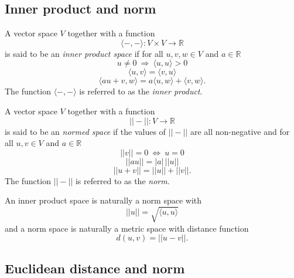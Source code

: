 \documentclass{amsart}
\begin{document}
	\subsection*{Inner product and norm} \label{inner_product_and_norm}	
	
	A vector space $V$ together with a function
	\begin{equation*}	
	\langle -, - \rangle : V \times V \to \mathbb R	
	\end{equation*}
	is said to be an \textit{inner product space} if for all $u,v,w \in V$ and $a \in \mathbb R$
	\begin{equation*}	
	u \neq 0\ \Rightarrow\ \langle u, u \rangle > 0 	
	\end{equation*}	
	\begin{equation*}	
	\langle u, v\rangle = \langle v, u\rangle	
	\end{equation*}
	\begin{equation*}
	\langle au+v, w \rangle = a\langle u, w \rangle + \langle v, w \rangle.	
	\end{equation*}	
	The function $\langle -, - \rangle$ is referred to as the \textit{inner product}.
	
	A vector space $V$ together with a function	
	\begin{equation*}	
	||-|| : V \to \mathbb R	
	\end{equation*}	
	is said to be an \textit{normed space} if the values of $||-||$ are all non-negative and for all $u,v \in V$ and $a \in \mathbb R$	
	\begin{equation*}	
	||v|| = 0\ \Leftrightarrow\ u = 0	
	\end{equation*}	
	\begin{equation*}	
	||a u || = |a|\, ||u||	
	\end{equation*}	
	\begin{equation*}	
	||u+v|| = ||u|| + ||v||.	
	\end{equation*}	
	The function $||-||$ is referred to as the \textit{norm}.
	
	An inner product space is naturally a norm space with	
	\begin{equation*}	
	||u|| = \sqrt{\langle u, u \rangle}	
	\end{equation*}	
	and a norm space is naturally a
	metric space with distance function	
	\begin{equation*}	
	d(u,v) = ||u-v||.	
	\end{equation*}
	
	\subsection*{Euclidean distance and norm} \label{euclidean_distance_and_norm}
	
\end{document}
